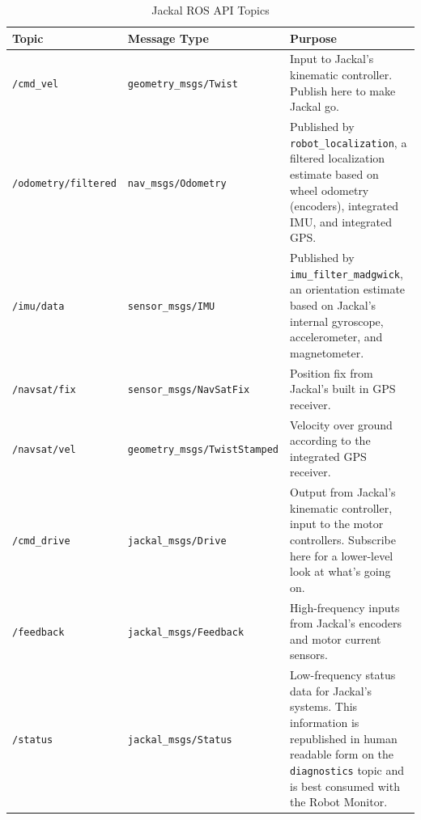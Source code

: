 \documentclass[]{clearpath-latex/clearpath-manual}
\begin{document}
\begin{table}[ht]
\begin{tabular}{  l  l  p{7cm} }
\hline
Topic & Message Type & Purpose \\ \hline

\lstinline{/cmd_vel} & \lstinline{geometry_msgs/Twist} & 
Input to Jackal's kinematic controller. Publish here to make Jackal go. \\ \hline
\lstinline{/odometry/filtered} & \lstinline{nav_msgs/Odometry} & 
Published by \lstinline{robot_localization}, a filtered localization estimate based
on wheel odometry (encoders), integrated IMU, and integrated GPS. \\ \hline

\lstinline{/imu/data} & \lstinline{sensor_msgs/IMU} & 
Published by \lstinline{imu_filter_madgwick}, an orientation estimate based on Jackal's
internal gyroscope, accelerometer, and magnetometer. \\ \hline
\lstinline{/navsat/fix} & \lstinline{sensor_msgs/NavSatFix} & 
Position fix from Jackal's built in GPS receiver. \\ \hline
\lstinline{/navsat/vel} & \lstinline{geometry_msgs/TwistStamped} & 
Velocity over ground according to the integrated GPS receiver.\\ \hline

\lstinline{/cmd_drive} & \lstinline{jackal_msgs/Drive} &
Output from Jackal's kinematic controller, input to the motor controllers. Subscribe here for a lower-level look at what's going on. \\ \hline
\lstinline{/feedback} & \lstinline{jackal_msgs/Feedback} &
High-frequency inputs from Jackal's encoders and motor current sensors. \\ \hline
\lstinline{/status} & \lstinline{jackal_msgs/Status} &
Low-frequency status data for Jackal's systems. This information is republished in human
readable form on the \lstinline{diagnostics} topic and is best consumed with the Robot
Monitor. \\ \hline
\end{tabular}
\caption{Jackal ROS API Topics}
\label{table:rosapi}
\end{table}

\end{document}
